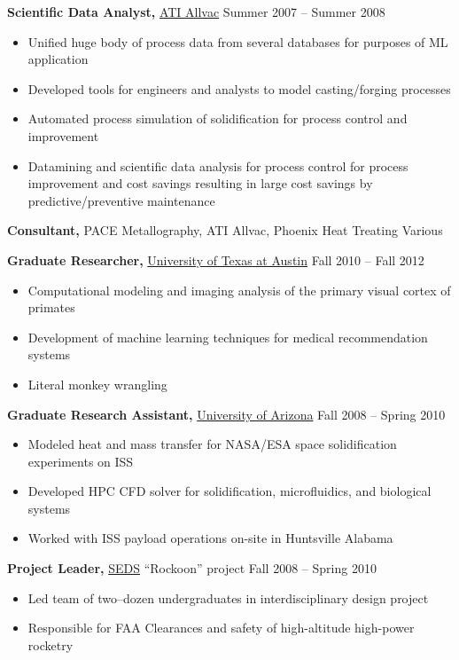 \documentclass{res}
\begin{document}
\begin{resume}
{\bf Scientific Data Analyst,} \href{https://www.atimetals.com/}{ATI Allvac} \hfill
Summer 2007 -- Summer 2008
\begin{itemize} \itemsep -2pt
  \item Unified huge body of process data from several databases for purposes of ML application
  \item Developed tools for engineers and analysts to model casting/forging processes
  \item Automated process simulation of solidification for process control and improvement
  \item Datamining and scientific data analysis for process control for process improvement and cost savings
    resulting in large cost savings by predictive/preventive maintenance
\end{itemize}

{\bf Consultant,} PACE Metallography, ATI Allvac, Phoenix Heat Treating \hfill Various

{\bf Graduate Researcher,} \href{https://www.utexas.edu/}{University of Texas at Austin} \hfill
Fall 2010 -- Fall 2012
\begin{itemize} \itemsep -2pt
  \item Computational modeling and imaging analysis of the primary visual cortex of primates
  \item Development of machine learning techniques for medical recommendation systems
  \item Literal monkey wrangling
\end{itemize}

{\bf Graduate Research Assistant,} \href{https://www.arizona.edu/}{University of Arizona} \hfill
Fall 2008 -- Spring 2010
\begin{itemize} \itemsep -2pt
  \item Modeled heat and mass transfer for NASA/ESA space solidification experiments on ISS
  \item Developed HPC CFD solver for solidification, microfluidics, and biological systems
  \item Worked with ISS payload operations on-site in Huntsville Alabama 
\end{itemize}

{\bf Project Leader,}  \href{https://seds.arizona.edu/}{SEDS} ``Rockoon''  project \hfill   Fall 2008 -- Spring 2010
\begin{itemize} \itemsep -2pt
  \item Led team of two--dozen undergraduates in interdisciplinary design project
  \item Responsible for FAA Clearances and safety of high-altitude high-power rocketry
\end{itemize}


\end{resume}
\end{document}
